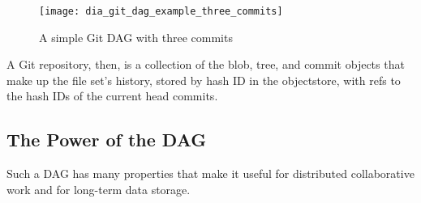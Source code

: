 \begin{figure}[h]
    \centering
    \texttt{[image: dia\_git\_dag\_example\_three\_commits]}
    \caption{A simple Git DAG with three commits}
    \label{dia_git_dag_example_three_commits}
\end{figure}

A Git repository, then, is a collection of the \gls{blob}, \gls{tree}, and
\gls{commit} objects that make up the file set's history, stored by hash ID in
the \gls{objectstore}, with \glspl{ref} to the hash IDs of the current head
\glspl{commit}\cite{git_initial_readme}.

%

\subsection{The Power of the DAG}

Such a \gls{DAG} has many properties that make it useful for distributed
collaborative work and for long-term data storage.

